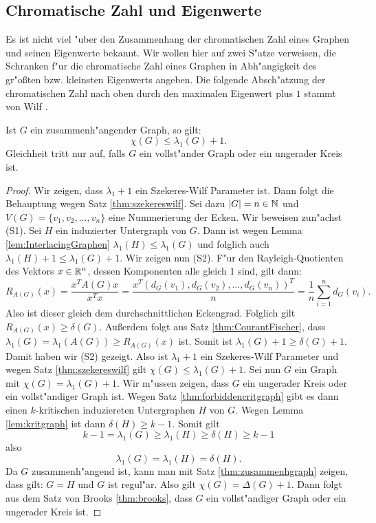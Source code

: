 \subsection{Chromatische Zahl und Eigenwerte}
Es ist nicht viel "uber den Zusammenhang der chromatischen Zahl eines Graphen und seinen Eigenwerte bekannt. Wir wollen hier auf zwei S"atze verweisen, die Schranken f"ur die chromatische Zahl eines Graphen in Abh"angigkeit des gr"o{\ss}ten bzw. kleinsten Eigenwerts angeben. Die folgende Absch"atzung der chromatischen Zahl nach oben durch den maximalen Eigenwert plus $1$ stammt von Wilf \cite{Wilf67}.

\begin{theorem}[Wilf]
  Ist $G$ ein zusammenh"angender Graph, so gilt: 
  $$\chi(G) \leq \lambda_{1}(G) +1.$$
  Gleichheit tritt nur auf, falls $G$ ein vollst"ander Graph oder ein ungerader Kreis ist.
  \label{thm:wilfev}
\end{theorem}

\begin{proof}
  Wir zeigen, dass $\lambda_{1}+1$ ein Szekeres-Wilf Parameter ist. Dann folgt die Behauptung wegen Satz \ref{thm:szekereswilf}. Sei dazu $|G| = n \in {\mathbb{N}}$ und $V(G)= \{v_1,v_2, \dots , v_n \}$ eine Nummerierung der Ecken. 
  Wir beweisen zun"achst (S1). Sei $H$ ein induzierter Untergraph von $G$. Dann ist wegen Lemma \ref{lem:InterlacingGraphen} $\lambda_{1}(H) \leq \lambda_{1}(G)$ und folglich auch $\lambda_{1}(H) +1 \leq \lambda_{1}(G) +1$.
  Wir zeigen nun (S2). F"ur den Rayleigh-Quotienten des Vektors $x\in {\mathbb{R}}^{n}$, dessen Komponenten alle gleich $1$ sind, gilt dann:
  $$R_{A(G)}(x) = \frac{x^{T}A(G)x}{x^{T}x} = \frac{x^{T}(d_G(v_1),d_G(v_2),\dots, d_G(v_n))^{T}}{n} = \frac{1}{n} \sum\limits_{i=1}^{n} d_G(v_i).$$ 
  Also ist dieser gleich dem durchschnittlichen Eckengrad. Folglich gilt $R_{A(G)}(x) \geq \delta(G)$. Au{\ss}erdem folgt aus Satz \ref{thm:CourantFischer}, dass $\lambda_{1}(G) = \lambda_{1}(A(G)) \geq R_{A(G)}(x)$ ist. Somit ist
  $\lambda_{1}(G) +1 \geq \delta(G) +1$. Damit haben wir (S2) gezeigt. 
  Also ist $\lambda_{1}+1$ ein Szekeres-Wilf Parameter und wegen Satz \ref{thm:szekereswilf} gilt $\chi(G) \leq \lambda_{1}(G) +1 $. 
  Sei nun $G$ ein Graph mit $\chi(G) = \lambda_{1}(G) +1$. Wir m"ussen zeigen, dass $G$ ein ungerader Kreis oder ein vollst"andiger Graph ist.
  Wegen Satz \ref{thm:forbiddencritgraph} gibt es dann einen $k$-kritischen induziereten Untergraphen $H$ von $G$. Wegen Lemma \ref{lem:kritgraph} ist dann $\delta(H) \geq k-1$. Somit gilt 
  $$k-1 = \lambda_{1}(G)  \geq \lambda_{1}(H) \geq \delta(H) \geq k-1$$
  also
  $$\lambda_{1}(G) = \lambda_{1}(H) = \delta(H).$$
  Da $G$ zusammenh"angend ist, kann man mit Satz \ref{thm:zusammenhgraph} zeigen, dass gilt: $G= H$ und $G$ ist regul"ar. Also gilt $\chi(G) = \Delta(G) +1 $. Dann folgt aus dem Satz von Brooks \ref{thm:brooks}, dass $G$ ein vollst"andiger Graph oder ein ungerader Kreis ist. 
\end{proof}

